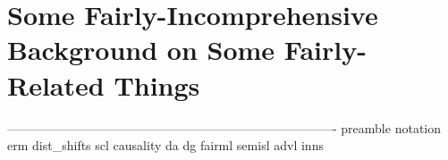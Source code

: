 \chapter{Some Fairly-Incomprehensive Background on Some Fairly-Related Things}\label{ch:background}
-------------------------------------------------------------------------------
{preamble}
{notation}
{erm}
{dist_shifts}
{scl}
{causality}
{da}
{dg}
{fairml}
{semisl}
{advl}
{inns}

